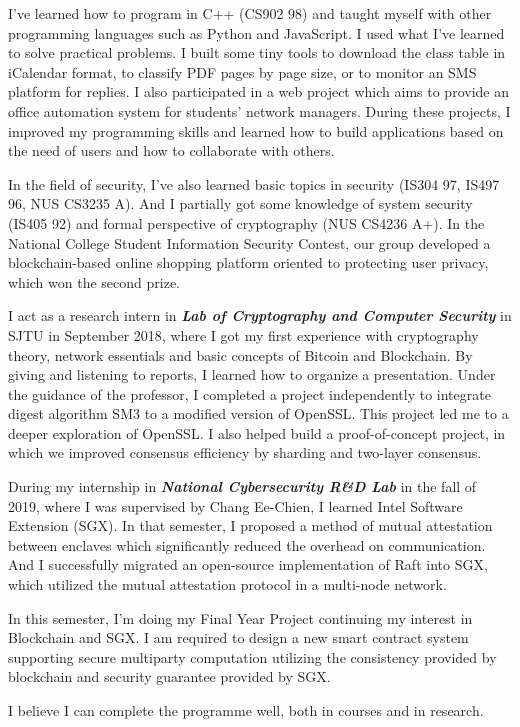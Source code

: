 
I've learned how to program in C++ (CS902 98) and taught myself with other programming languages such as Python and JavaScript.
I used what I've learned to solve practical problems.
I built some tiny tools to download the class table in iCalendar format, to classify PDF pages by page size, or to monitor an SMS platform for replies.
I also participated in a web project which aims to provide an office automation system for students' network managers.
During these projects, I improved my programming skills and learned how to build applications based on the need of users and how to collaborate with others.

In the field of security, I've also learned basic topics in security (IS304 97, IS497 96, NUS CS3235 A).
And I partially got some knowledge of system security (IS405 92) and formal perspective of cryptography (NUS CS4236 A+).
In the National College Student Information Security Contest, our group developed a blockchain-based online shopping platform oriented to protecting user privacy, which won the second prize.

I act as a research intern in \textit{\textbf{Lab of Cryptography and Computer Security}} in SJTU in September 2018, where I got my first experience with cryptography theory, network essentials and basic concepts of Bitcoin and Blockchain. By giving and listening to reports, I learned how to organize a presentation.
Under the guidance of the professor, I completed a project independently to integrate digest algorithm SM3 to a modified version of OpenSSL. This project led me to a deeper exploration of OpenSSL.
I also helped build a proof-of-concept project, in which we improved consensus efficiency by sharding and two-layer consensus.

During my internship in \textit{\textbf{National Cybersecurity R\&D Lab}} in the fall of 2019, where I was supervised by Chang Ee-Chien, I learned Intel Software Extension (SGX).
In that semester, I proposed a method of mutual attestation between enclaves which significantly reduced the overhead on communication.
And I successfully migrated an open-source implementation of Raft into SGX, which utilized the mutual attestation protocol in a multi-node network.

In this semester, I'm doing my Final Year Project continuing my interest in Blockchain and SGX.
I am required to design a new smart contract system supporting secure multiparty computation utilizing the consistency provided by blockchain and security guarantee provided by SGX.

I believe I can complete the programme well, both in courses and in research.